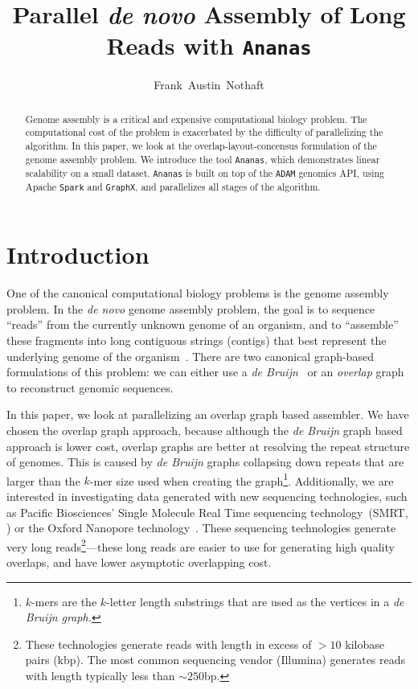 \documentclass[11pt]{article}
\date{}
\theoremstyle{plain}
\begin{document}
\title{Parallel \emph{de novo} Assembly of Long Reads with \texttt{Ananas}}
\author{Frank~Austin~Nothaft}
\maketitle

\begin{abstract}
Genome assembly is a critical and expensive computational biology problem. The computational cost
of the problem is exacerbated by the difficulty of parallelizing the algorithm. In this paper,
we look at the overlap-layout-concensus formulation of the genome assembly problem. We introduce
the tool \texttt{Ananas}, which demonstrates linear scalability on a small dataset. \texttt{Ananas}
is built on top of the \texttt{ADAM} genomics API, using Apache \texttt{Spark} and \texttt{GraphX},
and parallelizes all stages of the algorithm.
\end{abstract}

\section{Introduction}
\label{sec:introduction}

One of the canonical computational biology problems is the genome assembly problem. In the
\emph{de novo} genome assembly problem, the goal is to sequence ``reads'' from the currently
unknown genome of an organism, and to ``assemble'' these fragments into long contiguous strings
(contigs) that best represent the underlying genome of the organism~\cite{pevzner01}.
There are two canonical graph-based formulations of this problem: we can either use a
\emph{de Bruijn}~\cite{pevzner01} or an \emph{overlap} graph~\cite{myers95} to reconstruct
genomic sequences.

In this paper, we look at parallelizing an overlap graph based assembler. We have chosen the
overlap graph approach, because although the \emph{de Bruijn} graph based approach is lower cost,
overlap graphs are better at resolving the repeat structure of genomes. This is caused by
\emph{de Bruijn} graphs collapsing down repeats that are larger than the $k$-mer size used
when creating the graph\footnote{$k$-mers are the $k$-letter length substrings that are used as
the vertices in a \emph{de Bruijn graph.}}. Additionally, we are interested in investigating
data generated with new sequencing technologies, such as Pacific Biosciences' Single Molecule
Real Time sequencing technology~(SMRT, \cite{eid09}) or the Oxford Nanopore technology~\cite{clarke09}.
These sequencing technologies generate very long reads\footnote{These technologies generate reads
with length in excess of $>10$ kilobase pairs (kbp). The most common sequencing vendor (Illumina)
generates reads with length typically less than $\sim250$bp.}---these long reads are easier to
use for generating high quality overlaps, and have lower asymptotic overlapping cost.
\end{document}
